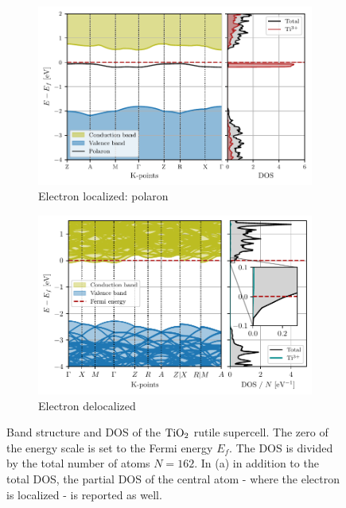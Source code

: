 \begin{figure}
    \centering
    \begin{subfigure}[b]{\textwidth}
        \centering
        \includegraphics[width=\textwidth]{figures/polaron}
        \caption{Electron localized: polaron}
        \label{fig:polaron_bands}
    \end{subfigure}
    \hfill
    \begin{subfigure}[b]{\textwidth}
        \centering
        \includegraphics[width=\textwidth]{figures/deloc}
        \caption{Electron delocalized}
        \label{fig:delocalized_bands}
    \end{subfigure}
    \caption{Band structure and DOS of the $\ce{TiO_2}$ rutile supercell. The zero of the energy scale is set to the Fermi energy $E_f$. The DOS is divided by the total number of atoms $N = 162$. In (a) in addition to the total DOS, the partial DOS of the central atom - where the electron is localized - is reported as well.}
    \label{fig:bands_super}
\end{figure}

